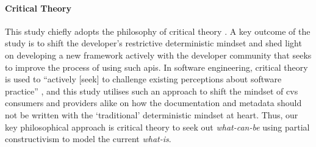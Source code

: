 \paragraph{Critical Theory}
This study chiefly adopts the philosophy of critical theory \citep{Calhoun:1995ww}. A key outcome of the study is to shift the developer's restrictive deterministic mindset and shed light on developing a new framework actively with the developer community that seeks to improve the process of using such \glspl{api}. In software engineering, critical theory is used to ``actively [seek] to challenge existing perceptions about software practice'' \citep{Easterbrook:2007ws}, and this study utilises such an approach to shift the mindset of \gls{cvs} consumers and providers alike on how the documentation and metadata should not be written with the `traditional' deterministic mindset at heart. Thus, our key philosophical approach is critical theory to seek out \textit{what-can-be} using  partial constructivism to model the current \textit{what-is}.
